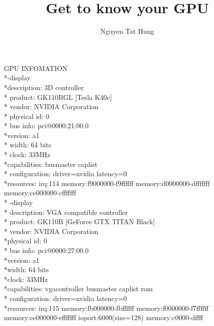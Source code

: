 \documentclass{article}
\title{Get to know your GPU}
\author{Nguyen Tat Hung}
\begin{document}
   \maketitle
   GPU INFOMATION
   \\*-display                 
       \\*description: 3D controller
      \\* product: GK110BGL [Tesla K40c]
      \\* vendor: NVIDIA Corporation
      \\* physical id: 0
      \\* bus info: pci@0000:21:00.0
       \\*version: a1
      \\* width: 64 bits
      \\* clock: 33MHz
       \\*capabilities: busmaster caplist
      \\* configuration: driver=nvidia latency=0
       \\*resources: irq:114 memory:f9000000-f9ffffff memory:d0000000-dfffffff memory:ce000000-cfffffff
 \\* -display
      \\* description: VGA compatible controller
      \\* product: GK110B [GeForce GTX TITAN Black]
      \\* vendor: NVIDIA Corporation
       \\*physical id: 0
      \\* bus info: pci@0000:27:00.0
       \\*version: a1
       \\*width: 64 bits
       \\*clock: 33MHz
       \\*capabilities: vgacontroller busmaster caplist rom
      \\* configuration: driver=nvidia latency=0
       \\*resources: irq:115 memory:fb000000-fbffffff memory:f0000000-f7ffffff memory:ee000000-efffffff ioport:6000(size=128) memory:c0000-dffff
\end{document}
